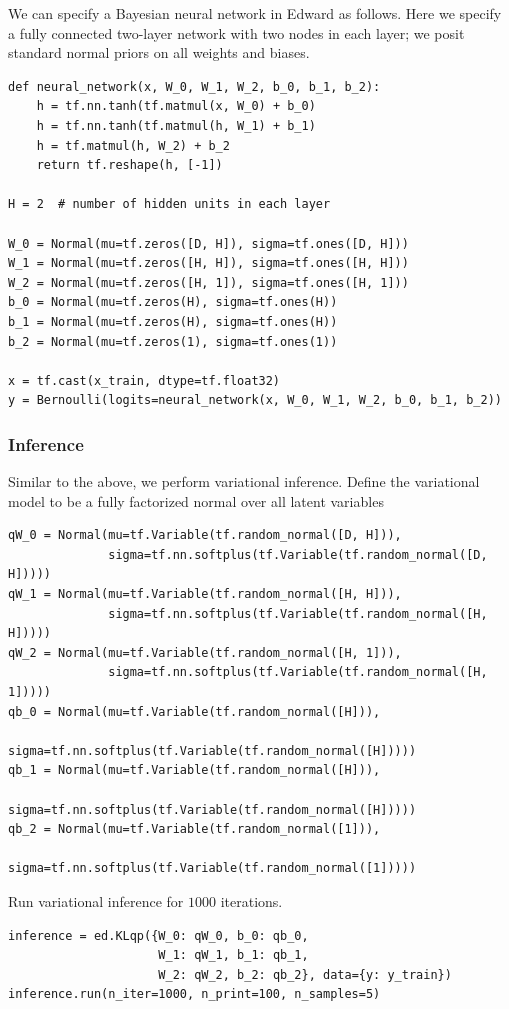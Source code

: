 We can specify a Bayesian neural network in Edward as follows. Here we specify a
fully connected two-layer network with two nodes in each layer; we posit
standard normal priors on all weights and biases.
\begin{lstlisting}
def neural_network(x, W_0, W_1, W_2, b_0, b_1, b_2):
    h = tf.nn.tanh(tf.matmul(x, W_0) + b_0)
    h = tf.nn.tanh(tf.matmul(h, W_1) + b_1)
    h = tf.matmul(h, W_2) + b_2
    return tf.reshape(h, [-1])

H = 2  # number of hidden units in each layer

W_0 = Normal(mu=tf.zeros([D, H]), sigma=tf.ones([D, H]))
W_1 = Normal(mu=tf.zeros([H, H]), sigma=tf.ones([H, H]))
W_2 = Normal(mu=tf.zeros([H, 1]), sigma=tf.ones([H, 1]))
b_0 = Normal(mu=tf.zeros(H), sigma=tf.ones(H))
b_1 = Normal(mu=tf.zeros(H), sigma=tf.ones(H))
b_2 = Normal(mu=tf.zeros(1), sigma=tf.ones(1))

x = tf.cast(x_train, dtype=tf.float32)
y = Bernoulli(logits=neural_network(x, W_0, W_1, W_2, b_0, b_1, b_2))
\end{lstlisting}

\subsubsection{Inference}

Similar to the above, we perform variational inference. Define the variational
model to be a fully factorized normal over all latent variables
\begin{lstlisting}
qW_0 = Normal(mu=tf.Variable(tf.random_normal([D, H])),
              sigma=tf.nn.softplus(tf.Variable(tf.random_normal([D, H]))))
qW_1 = Normal(mu=tf.Variable(tf.random_normal([H, H])),
              sigma=tf.nn.softplus(tf.Variable(tf.random_normal([H, H]))))
qW_2 = Normal(mu=tf.Variable(tf.random_normal([H, 1])),
              sigma=tf.nn.softplus(tf.Variable(tf.random_normal([H, 1]))))
qb_0 = Normal(mu=tf.Variable(tf.random_normal([H])),
              sigma=tf.nn.softplus(tf.Variable(tf.random_normal([H]))))
qb_1 = Normal(mu=tf.Variable(tf.random_normal([H])),
              sigma=tf.nn.softplus(tf.Variable(tf.random_normal([H]))))
qb_2 = Normal(mu=tf.Variable(tf.random_normal([1])),
              sigma=tf.nn.softplus(tf.Variable(tf.random_normal([1]))))
\end{lstlisting}

Run variational inference for $1000$ iterations.
\begin{lstlisting}
inference = ed.KLqp({W_0: qW_0, b_0: qb_0,
                     W_1: qW_1, b_1: qb_1,
                     W_2: qW_2, b_2: qb_2}, data={y: y_train})
inference.run(n_iter=1000, n_print=100, n_samples=5)
\end{lstlisting}

